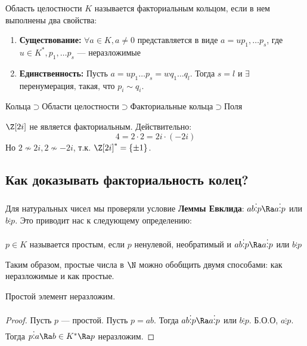 \begin{definition}
    Область целостности \(K\) называется факториальным кольцом, если в нем выполнены два свойства:
    \begin{enumerate}
        \item \textbf{Существование:} \(\forall a \in K, a \ne 0\) представляется в виде \(a = up_1, \dots p_s\), где \(u \in K^*, p_1, \dots p_s\) --- неразложимые
        \item \textbf{Единственность:} Пусть \(a = up_1\dots p_s = wq_1\dots q_l\). Тогда \(s = l\) и \(\exists\) перенумерация, такая, что \(p_i \sim q_i\).
    \end{enumerate}
\end{definition}

\begin{note}
    \(\text{Кольца} \supset \text{Области целостности} \supset \text{Факториальные кольца} \supset \text{Поля}\)
\end{note}

\begin{example}
    \(\Z[2i]\) не является факториальным. Действительно:
    \[4 = 2 \cdot 2 = 2i \cdot (-2i)\]
    Но \(2 \not\sim 2i, 2 \not\sim -2i\), т.к. \(\Z[2i]^* = \{\pm 1\}\).
\end{example}


\subsection{Как доказывать факториальность колец?}
Для натуральных чисел мы проверяли условие \textbf{Леммы Евклида}: \(ab \vdots p \Ra a\vdots p\) или \(b \vdots p\). Это приводит нас к следующему определению:

\begin{definition}
    \(p \in K\) называется простым, если \(p\) ненулевой, необратимый и \(ab \vdots p \Ra a \vdots p\) или \(b \vdots p\)
\end{definition}

\begin{note}
    Таким образом, простые числа в \(\N\) можно обобщить двумя способами: как неразложимые и как простые.
\end{note}

\begin{proposition}
    Простой элемент неразложим.
\end{proposition}
\begin{proof}
    Пусть \(p\) --- простой. Пусть \(p = ab\). Тогда \(ab \vdots p \Ra a \vdots p\) или \(b \vdots p\). Б.О.О, \(a \vdots p\). Тогда \(p \vdots a \Ra b \in K^* \Ra p\) неразложим.
\end{proof}

